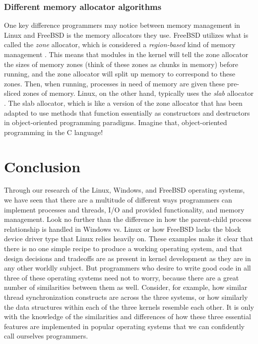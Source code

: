 \documentclass[letterpaper,10pt,titlepage]{article}
\begin{document}
\subsubsection{Different memory allocator algorithms}
One key difference programmers may notice between memory management in Linux and FreeBSD is the memory allocators they use. FreeBSD utilizes what is called the \emph{zone} allocator, which is considered a \emph{region-based} kind of memory management \cite{freeBSD3}. This means that modules in the kernel will tell the zone allocator the sizes of memory zones (think of these zones as chunks in memory) before running, and the zone allocator will split up memory to correspond to these zones. Then, when running, processes in need of memory are given these pre-sliced zones of memory. Linux, on the other hand, typically uses the \emph{slab} allocator \cite{linux2}. The slab allocator, which is like a version of the zone allocator that has been adapted to use methods that function essentially as constructors and destructors in object-oriented programming paradigms. Imagine that, object-oriented programming in the C language! 

\section{Conclusion}
Through our research of the Linux, Windows, and FreeBSD operating systems, we have seen that there are a multitude of different ways programmers can implement processes and threads, I/O and provided functionality, and memory management. Look no further than the difference in how the parent-child process relationship is handled in Windows vs. Linux or how FreeBSD lacks the block device driver type that Linux relies heavily on. These examples make it clear that there is no one simple recipe to produce a working operating system, and that design decisions and tradeoffs are as present in kernel development as they are in any other worldly subject. But programmers who desire to write good code in all three of these operating systems need not to worry, because there are a great number of similarities between them as well. Consider, for example, how similar thread synchronization constructs are across the three systems, or how similarly the data structures within each of the three kernels resemble each other. It is only with the knowledge of the similarities and differences of how these three essential features are implemented in popular operating systems that we can confidently call ourselves programmers.


\newpage
{}

\end{document}
